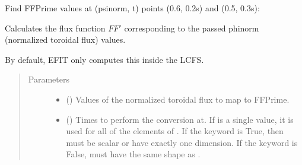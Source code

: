 \documentclass[letterpaper,10pt,english]{sphinxmanual}
\begin{document}
\begin{fulllineitems}
\begin{fulllineitems}
Find FFPrime values at (psinorm, t) points (0.6, 0.2s) and (0.5, 0.3s):

\begin{sphinxVerbatim}[commandchars=\\\{\}]
  \PYG{p}{[} \PYG{p}{]} \PYG{p}{[} \PYG{p}{]} 
\end{sphinxVerbatim}

\end{fulllineitems}


\begin{fulllineitems}
\label{\detokenize{eqtools:eqtools.core.Equilibrium.phinorm2FFPrime}}
Calculates the flux function \(FF'\) corresponding to the passed phinorm (normalized toroidal flux) values.

By default, EFIT only computes this inside the LCFS.
\begin{quote}\begin{description}
\item[{Parameters}] \leavevmode\begin{itemize}
\item {} 
 () \textendash{} Values of the normalized
toroidal flux to map to FFPrime.

\item {} 
 () \textendash{} Times to perform the conversion at.
If  is a single value, it is used for all of the elements of
. If the  keyword is True, then  must be scalar
or have exactly one dimension. If the  keyword is False,
 must have the same shape as .


\end{itemize}
\end{description}
\end{quote}
\end{fulllineitems}
\end{fulllineitems}
\end{document}
